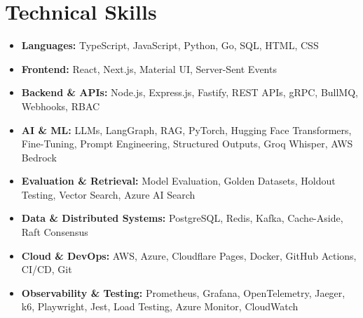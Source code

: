 \documentclass[letterpaper,10.5pt]{article}
\newcommand{\resumeItem}[1]{
  \item{#1}\par\vspace{-2pt}
}
\newcommand{\resumeItemListStart}{
  \begin{itemize}[
    leftmargin=0.15in,
    itemsep=0pt,
    topsep=0pt,
    parsep=0pt,
    partopsep=0pt
  ]
}
\newcommand{\resumeItemListEnd}{
  \end{itemize}\vspace{-4pt}
}
\begin{document}
\section{Technical Skills}
\resumeItemListStart
\resumeItem{\textbf{Languages:} TypeScript, JavaScript, Python, Go, SQL, HTML, CSS}
\resumeItem{\textbf{Frontend:} React, Next.js, Material UI, Server-Sent Events}
\resumeItem{\textbf{Backend \& APIs:} Node.js, Express.js, Fastify, REST APIs, gRPC, BullMQ, Webhooks, RBAC}
\resumeItem{\textbf{AI \& ML:} LLMs, LangGraph, RAG, PyTorch, Hugging Face Transformers, Fine-Tuning, Prompt Engineering, Structured Outputs, Groq Whisper, AWS Bedrock}
\resumeItem{\textbf{Evaluation \& Retrieval:} Model Evaluation, Golden Datasets, Holdout Testing, Vector Search, Azure AI Search}
\resumeItem{\textbf{Data \& Distributed Systems:} PostgreSQL, Redis, Kafka, Cache-Aside, Raft Consensus}
\resumeItem{\textbf{Cloud \& DevOps:} AWS, Azure, Cloudflare Pages, Docker, GitHub Actions, CI/CD, Git}
\resumeItem{\textbf{Observability \& Testing:} Prometheus, Grafana, OpenTelemetry, Jaeger, k6, Playwright, Jest, Load Testing, Azure Monitor, CloudWatch}
\resumeItemListEnd
\end{document}
